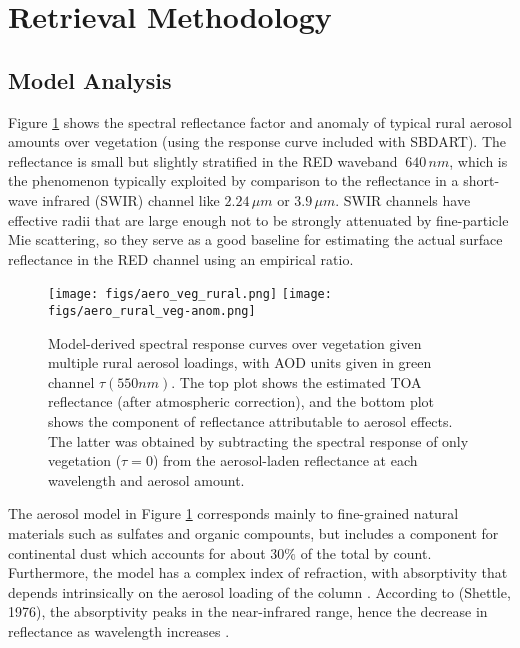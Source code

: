 \documentclass[12pt]{article}
\begin{document}
\section{Retrieval Methodology}

\subsection{Model Analysis}

Figure \ref{rural-response} shows the spectral reflectance factor and anomaly of typical rural aerosol amounts over vegetation (using the response curve included with SBDART). The reflectance is small but slightly stratified in the RED waveband $~640\,\si{nm}$, which is the phenomenon typically exploited by comparison to the reflectance in a short-wave infrared (SWIR) channel like $2.24\,\si{\mu m}$ or $3.9\,\si{\mu m}$. SWIR channels have effective radii that are large enough not to be strongly attenuated by fine-particle Mie scattering, so they serve as a good baseline for estimating the actual surface reflectance in the RED channel using an empirical ratio.

\begin{figure}[h!]
    \centering
    \begin{center}
        \texttt{[image: figs/aero\_veg\_rural.png]}
        \texttt{[image: figs/aero\_rural\_veg-anom.png]}
    \end{center}
    \caption{Model-derived spectral response curves over vegetation given multiple rural aerosol loadings, with AOD units given in green channel $\tau(550nm)$. The top plot shows the estimated TOA reflectance (after atmospheric correction), and the bottom plot shows the component of reflectance attributable to aerosol effects. The latter was obtained by subtracting the spectral response of only vegetation ($\tau=0$) from the aerosol-laden reflectance at each wavelength and aerosol amount.}
    \label{rural-response}
\end{figure}

\clearpage

The aerosol model in Figure \ref{rural-response} corresponds mainly to fine-grained natural materials such as sulfates and organic compounts, but includes a component for continental dust which accounts for about $30\%$ of the total by count. Furthermore, the model has a complex index of refraction, with absorptivity that depends intrinsically on the aerosol loading of the column \cite{remer_modis_2005}. According to (Shettle, 1976), the absorptivity peaks in the near-infrared range, hence the decrease in reflectance as wavelength increases \cite{shettle_models_1976}.
\end{document}
